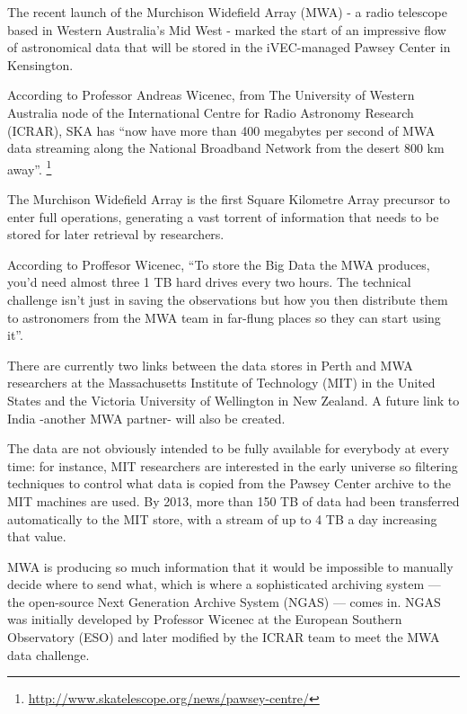 
The recent launch of the Murchison Widefield Array (MWA) - a radio telescope based in Western Australia's Mid West - marked the start of an impressive flow of astronomical data that will be stored in the iVEC-managed Pawsey Center in Kensington. \newline

According to Professor Andreas Wicenec, from The University of Western Australia node of the International Centre for Radio Astronomy Research (ICRAR), SKA has ``now have more than 400 megabytes per second of MWA data streaming along the National Broadband Network from the desert 800 km away''. \footnote{\url{http://www.skatelescope.org/news/pawsey-centre/}}  \newline

The Murchison Widefield Array is the first Square Kilometre Array precursor to enter full operations, generating a vast torrent of information that needs to be stored for later retrieval by researchers. \newline

According to Proffesor Wicenec, ``To store the Big Data the MWA produces, you’d need almost three 1 TB hard drives every two hours. The technical challenge isn't just in saving the observations but how you then distribute them to astronomers from the MWA team in far-flung places so they can start using it''.

There are currently two links between the data stores in Perth and MWA researchers at the Massachusetts Institute of Technology (MIT) in the United States and the Victoria University of Wellington in New Zealand. A future link to India -another MWA partner- will also be created. \newline

The data are not obviously intended to be fully available for everybody at every time: for instance, MIT researchers are interested in the early universe so filtering techniques to control what data is copied from the Pawsey Center archive to the MIT machines are used. By 2013, more than 150 TB of data had been transferred automatically to the MIT store, with a stream of up to 4 TB a day increasing that value. \newline

MWA is producing so much information that it would be impossible to manually decide where to send what, which is where a sophisticated archiving system — the open-source Next Generation Archive System (NGAS) — comes in. NGAS was initially developed by Professor Wicenec at the European Southern Observatory (ESO) and later modified by the ICRAR team to meet the MWA data challenge. \newline


